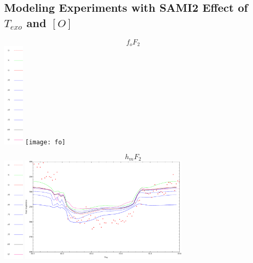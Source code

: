 \documentclass{beamer}
\begin{document}
\subsection{Modeling Experiments with SAMI2 {Effect of $T_{exo}$ and $\left[O\right]$}}
\begin{frame}{$$f_o F_2$$}
  \includegraphics[height=2in]{legend}
  \texttt{[image: fo]}
\end{frame}

\begin{frame}{$$h_m F_2$$}
  \includegraphics[height=2in]{legend}
  \includegraphics[height=2in]{hm}
\end{frame}
\end{document}
